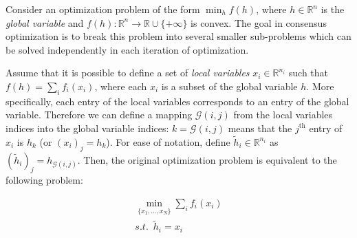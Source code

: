 \documentclass{article}
\DeclareMathOperator*{\argmin}{argmin}
\newcommand{\norm}[1]{\left\lVert #1 \right\rVert}
\begin{document}

Consider an optimization problem of the form $\min_h f(h)$, where $h\in\mathbb{R}^n$ is the \textit{global variable} and $f(h):\mathbb{R}^n \rightarrow \mathbb{R}\cup \{+\infty\}$ is convex. The goal in consensus optimization is to break this problem into several smaller sub-problems which can be solved independently in each iteration of optimization. 

Assume that it is possible to define a set of \textit{local variables} $x_i \in \mathbb{R}^{n_i}$ such that $f(h)=\sum_i f_i(x_i)$, where each $x_i$ is a subset of the global variable $h$. More specifically, each entry of the local variables corresponds to an entry of the global variable. Therefore we can define a mapping $\mathscr{G}(i,j)$ from the local variables indices into the global variable indices: $k=\mathscr{G}(i,j)$ means that the $j^\text{th}$ entry of $x_i$ is $h_k$ (or $(x_i)_j=h_k$). For ease of notation, define $\tilde{h}_i \in \mathbb{R}^{n_i}$ as $(\tilde{h}_i)_j=h_{\mathscr{G}(i,j)}$. Then, the original optimization problem is equivalent to the following problem: 

\begin{equation}
\begin{aligned}
\min_{\{x_1,...,x_N  \}} \sum_i f_i(x_i)\\
 s.t. \,\,\, \tilde{h}_i=x_i \,\,\,\,\,\,
\end{aligned}
\label{eq:consADMM}
\end{equation}
\end{document}
